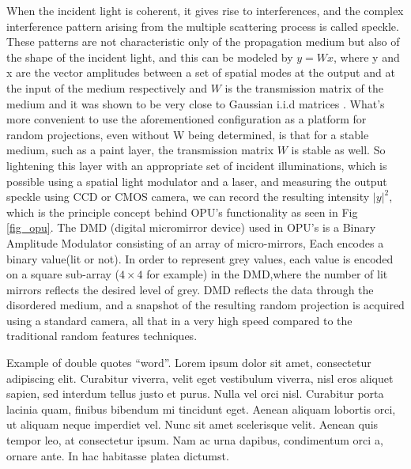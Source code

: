 When the incident light is coherent, it gives rise to interferences, and the complex interference pattern arising from the multiple scattering process is called speckle. These patterns are not characteristic only of the propagation medium but also of the shape of the incident light, and this can be modeled by $y=Wx$, where y and x are the vector amplitudes between a set of spatial modes at the output and at the input of the medium respectively and $W$ is the transmission matrix of the medium and it was shown to be very close to Gaussian i.i.d matrices \citep{saade_opu}. What's more convenient to use the aforementioned configuration as a platform for random projections, even without W being determined, is that for a stable medium, such as a paint layer, the transmission matrix $W$ is stable as well. 
So lightening this layer with an appropriate set of incident illuminations, which is possible using a spatial light modulator and a laser, and measuring the output speckle using CCD or CMOS camera, we can record the resulting intensity $|y|^2$, which is the principle concept behind OPU's functionality as seen in Fig~ \ref{fig_opu}.\newline
The DMD (digital micromirror device) used in OPU's is a Binary Amplitude Modulator consisting of an array of micro-mirrors, Each encodes a binary value(lit or not). In order to represent grey values, each value is encoded on a square sub-array ($4\times 4$ for example) in the DMD,where the number of lit mirrors reflects the desired level of grey. DMD reflects the data through the disordered medium, and a snapshot of the resulting random projection is acquired using a standard camera, all that in a very high speed compared to the traditional random features techniques. 



\iffalse
Example of double quotes ``word''. Lorem ipsum dolor sit amet, consectetur adipiscing elit. Curabitur viverra, velit eget vestibulum viverra, nisl eros aliquet sapien, sed interdum tellus justo et purus. Nulla vel orci nisl. Curabitur porta lacinia quam, finibus bibendum mi tincidunt eget. Aenean aliquam lobortis orci, ut aliquam neque imperdiet vel. Nunc sit amet scelerisque velit. Aenean quis tempor leo, at consectetur ipsum. Nam ac urna dapibus, condimentum orci a, ornare ante. In hac habitasse platea dictumst. 
